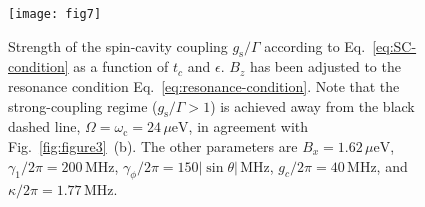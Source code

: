 \documentclass[twocolumn,english,aps,prl,preprint,reprint,showpacs,longbibliography,showkeys]{revtex4-1}
\begin{document}
\begin{figure}
\texttt{[image: fig7]}

\protect\caption{\label{fig:figure7}Strength of the spin-cavity coupling $g_{\mathrm{s}}/\Gamma$ according to Eq.~\eqref{eq:SC-condition} as a function of  $t_c$ and  $\epsilon$. $B_z$ has been adjusted to the resonance condition Eq.~\eqref{eq:resonance-condition}. 
Note that the strong-coupling regime ($g_{\mathrm{s}}/\Gamma>1$) is achieved away from the black dashed line,  $\Omega=\omega_{\mathrm{c}}=24\,\mu\mathrm{eV}$, in agreement with Fig.~\ref{fig:figure3}~(b).
The other parameters are   $B_x=1.62\,\mu\mathrm{eV}$,  $\gamma_1/2\pi=200\,\mathrm{MHz}$, $\gamma_{\phi}/2\pi=150|\sin{\theta}|\,\mathrm{MHz}$, $g_c/2\pi=40\,\mathrm{MHz}$, and $\kappa/2\pi=1.77\,\mathrm{MHz}$. }
\end{figure}
\end{document}

